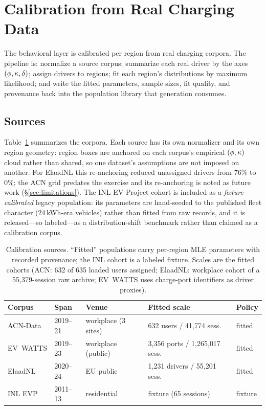 \section{Calibration from Real Charging Data}
\label{sec:calibration}

The behavioral layer is calibrated per region from real charging corpora. The
pipeline is: normalize a source corpus; summarize each real driver by the
axes $(\phi, \kappa, \delta)$; assign drivers to regions; fit each
region's distributions by maximum likelihood; and write the fitted parameters,
sample sizes, fit quality, and provenance back into the population library
that generation consumes.

\subsection{Sources}
\label{sec:sources}

Table~\ref{tab:sources} summarizes the corpora. Each source has its own
normalizer and its own region geometry: region boxes are anchored on each
corpus's empirical $(\phi,\kappa)$ cloud rather than shared, so one
dataset's assumptions are not imposed on another. For ElaadNL this
re-anchoring reduced unassigned drivers from 76\% to 0\%; the ACN grid
predates the exercise and its re-anchoring is noted as future work
(\S\ref{sec:limitations}). The INL EV Project cohort is included as a
\emph{fixture-calibrated} legacy population: its parameters are hand-seeded to
the published fleet character (24\,kWh-era vehicles) rather than fitted from
raw records, and it is released---so labeled---as a distribution-shift
benchmark rather than claimed as a calibration corpus.

\begin{table}[t]
\caption{Calibration sources. ``Fitted'' populations carry per-region MLE
parameters with recorded provenance; the INL cohort is a labeled fixture.
Scales are the fitted cohorts (ACN: 632 of 635 loaded users assigned;
ElaadNL: workplace cohort of a 55{,}379-session raw archive; EV~WATTS uses
charge-port identifiers as driver proxies).}
\label{tab:sources}
\centering\small
\begin{tabular}{@{}lllll@{}}
\toprule
Corpus & Span & Venue & Fitted scale & Policy \\
\midrule
ACN-Data & 2019--21 & workplace (3 sites) & 632 users / 41{,}774 sess. & fitted \\
EV~WATTS & 2019--23 & workplace (public) & 3{,}356 ports / 1{,}265{,}017 sess. & fitted \\
ElaadNL & 2020--24 & EU public & 1{,}231 drivers / 55{,}201 sess. & fitted \\
INL EVP & 2011--13 & residential & fixture (65 sessions) & fixture \\
\bottomrule
\end{tabular}
\end{table}

